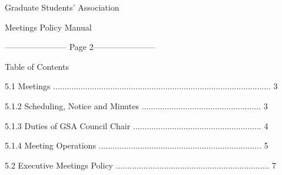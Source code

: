                                                   

                                              Graduate Students’ Association  

                                                   Meetings Policy Manual  

  


----------------------- Page 2-----------------------

                                                 Table of Contents  

  

5.1         Meetings ............................................................................................... 3  



    5.1.2           Scheduling, Notice and Minutes .................................................... 3  



    5.1.3           Duties of GSA Council Chair ........................................................ 4  



    5.1.4           Meeting Operations ....................................................................... 5  



5.2         Executive Meetings Policy ................................................................... 7  

  

  

  

  

  

  

  

  

  

  

  

  

  

  

  

  

  

  

  

  

  

  

  

  

